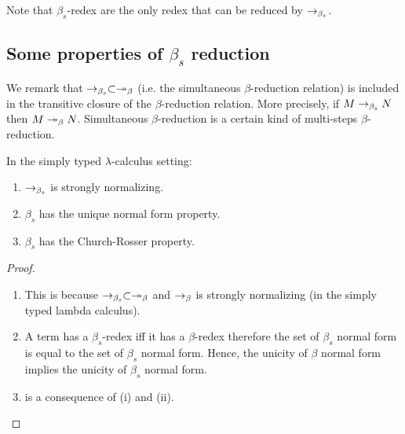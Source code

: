 Note that $\beta_s$-redex are the only redex that can be reduced by
$\rightarrow_{\beta_s}$.




\subsection{Some properties of $\beta_s$ reduction}

We remark that $\rightarrow_{\beta_s} \subset \twoheadrightarrow_\beta$ (i.e. the simultaneous
$\beta$-reduction relation) is included in the transitive closure of
the $\beta$-reduction relation. More precisely, if $M \rightarrow_{\beta_s} N$
then $M \twoheadrightarrow_\beta N$. Simultaneous $\beta$-reduction is a certain
kind of multi-steps $\beta$-reduction.

\begin{lem} In the simply typed $\lambda$-calculus setting:
\begin{enumerate}
\item $\rightarrow_{\beta_s}$ is strongly normalizing.
\item $\beta_s$ has the unique normal form property.
\item $\beta_s$ has the Church-Rosser property.
\end{enumerate}
\end{lem}

\begin{proof}
\begin{enumerate}


\item This is because $\rightarrow_{\beta_s} \subset \twoheadrightarrow_\beta$ and $\rightarrow_\beta$ is strongly normalizing (in the simply typed lambda calculus).

\item
A term has a $\beta_s$-redex iff it has a $\beta$-redex therefore
the set of $\beta_s$ normal form is equal to the set of $\beta_s$
normal form. Hence, the unicity of $\beta$ normal form implies the
unicity of $\beta_s$ normal form.

\item is a consequence of (i) and (ii).
\end{enumerate}
\end{proof}



